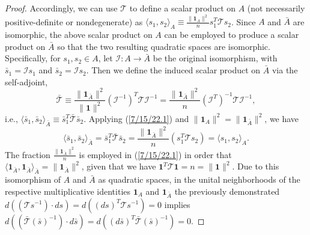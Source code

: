 \documentclass{amsart}
\numberwithin{equation}{section}
\theoremstyle{definition}
\numberwithin{theorem}{section}
\begin{document}
\begin{proof}
   Accordingly, we can use $\mathcal{\mathcal{T}}$ to define a scalar product on $A$ (not necessarily positive-definite or nondegenerate) as $\langle s_1,s_2\rangle_A \equiv  \frac{\|\mathbf{1}_{A}\|^2}{n}s_1^T \mathcal{\mathcal{T}} s_2$. 
    Since $A$ and $\bar{A}$ are isomorphic, the above scalar product on $A$ can be employed to produce a scalar product on $\bar{A}$ so that the two resulting quadratic spaces are isomorphic.  Specifically,  for $s_1,s_2\in A$, let $ \mathcal{I}:A\rightarrow\bar{A}$ be the original isomorphism, with $\bar{s}_1 = \mathcal{I}s_1$ and $\bar{s}_2 = \mathcal{I}s_2$.  Then we define the induced scalar product on $\bar{A}$ via the self-adjoint, \begin{equation}\label{7/15/22.1} \bar{\mathcal{\mathcal{T}}} \equiv  \frac{\|\mathbf{1}_{\bar{A}}\|^2}{\|\mathbf{1}\|^2}(\mathcal{I}^{-1})^T\mathcal{\mathcal{T}}\mathcal{I}^{-1} = \frac{\|\mathbf{1}_{\bar{A}}\|^2}{n}(\mathcal{I}^T)^{-1}\mathcal{\mathcal{T}}\mathcal{I}^{-1} ,\end{equation} i.e., $\langle \bar{s}_1,\bar{s}_2\rangle_{\bar{A}} \equiv \bar{s}_1^T \bar{\mathcal{\mathcal{T}}} \bar{s}_2$.  Applying (\ref{7/15/22.1}) and $\|\mathbf{1}_A\|^2 = \|\mathbf{1}_{\bar{A}}\|^2$, we have \begin{equation}\label{8/25/22.1} \langle \bar{s}_1,\bar{s}_2\rangle_{\bar{A}} = \bar{s}_1^T \bar{\mathcal{T}} \bar{s}_2 = \frac{\|\mathbf{1}_{\bar{A}}\|^2}{n}( s_1^T \mathcal{T} s_2) = \langle s_1,s_2\rangle_{A}.\end{equation}  The fraction $\frac{\|\mathbf{1}_{\bar{A}}\|^2}{n}$ is employed in (\ref{7/15/22.1}) in order that $\langle \mathbf{1}_{\bar{A}},\mathbf{1}_{\bar{A}}\rangle_{\bar{A}} = \|\mathbf{1}_{\bar{A}}\|^2$, given that we have $\mathbf{1}^T \mathcal{T}\mathbf{1} = n = \|\mathbf{1}\|^2$. Due to this isomorphism of $A$ and $\bar{A}$ as quadratic spaces,  in the unital neighborhoods of the respective multiplicative identities $\mathbf{1}_A$ and $\mathbf{1}_{\bar{A}}$ the previously demonstrated $d((\mathcal{T}s^{-1})\cdot ds) = d((ds)^T \mathcal{T}s^{-1}) = 0$ implies 
$d((\bar{\mathcal{T}}(\bar{s})^{-1})\cdot d\bar{s}) = d((d\bar{s})^T\bar{\mathcal{T}}(\bar{s})^{-1}) = 0$.


\end{proof}
\end{document}
